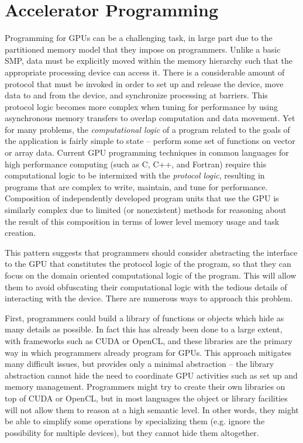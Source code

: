 \section{Accelerator Programming}

Programming for GPUs can be a challenging task, in large part due to
the partitioned memory model that they impose on programmers.  Unlike
a basic SMP, data must be explicitly moved within the memory hierarchy
such that the appropriate processing device can access it.  There is a
considerable amount of protocol that must be invoked in order to set
up and release the device, move data to and from the device, and
synchronize processing at barriers.  This protocol logic becomes more
complex when tuning for performance by using asynchronous memory
transfers to overlap computation and data movement.  Yet for many
problems, the \emph{computational logic} of a program related to the
goals of the application is fairly simple to state -- perform some set
of functions on vector or array data.  Current GPU programming
techniques in common languages for high performance computing (such as
C, C++, and Fortran) require this computational logic to be intermixed
with the \emph{protocol logic}, resulting in programs that are complex
to write, maintain, and tune for performance. Composition of
independently developed program units that use the GPU is similarly
complex due to limited (or nonexistent) methods for reasoning about
the result of this composition in terms of lower level memory usage
and task creation.

This pattern suggests that programmers should consider abstracting the
interface to the GPU that constitutes the protocol logic of the program, so
that they can focus on the domain oriented computational logic of the program.
This will allow them to avoid obfuscating their computational logic with the
tedious details of interacting with the device. There are numerous ways to
approach this problem.

First, programmers could build a library of functions or objects which hide as
many details as possible. In fact this has already been done to a large
extent, with frameworks such as CUDA or OpenCL, and these libraries are the
primary way in which programmers already program for GPUs. This approach
mitigates many difficult issues, but provides only a minimal abstraction --
the library abstraction cannot hide the need to coordinate GPU activities such
as set up and memory management. Programmers might try to create their own
libraries on top of CUDA or OpenCL, but in most languages the object or
library facilities will not allow them to reason at a high semantic level. In
other words, they might be able to simplify some operations by specializing
them (e.g. ignore the possibility for multiple devices), but they cannot hide
them altogether.

